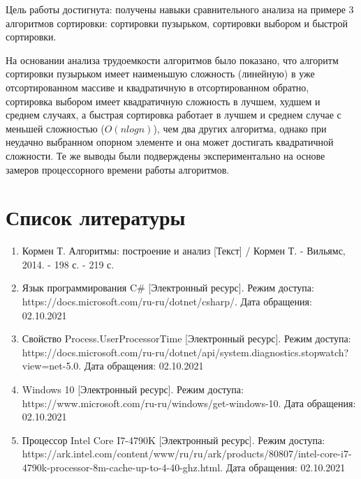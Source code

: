 \documentclass[12pt]{report}
\begin{document}
Цель работы достигнута: получены навыки сравнительного анализа на примере 3 алгоритмов сортировки: сортировки пузырьком, сортировки выбором и быстрой сортировки. 

На основании анализа трудоемкости алгоритмов было показано, что алгоритм сортировки пузырьком имеет наименьшую сложность (линейную) в уже отсортированном массиве и квадратичную в отсортированном обратно, сортировка выбором имеет квадратичную сложность в лучшем, худшем и среднем случаях, а быстрая сортировка работает в лучшем и среднем случае с меньшей сложностью ($O(nlogn)$), чем два других алгоритма, однако при неудачно выбранном опорном элементе и она может достигать квадратичной сложности. Те же выводы были подверждены экспериментально на основе замеров процессорного времени работы алгоритмов. 

\chapter*{Список литературы}
\begin{enumerate}
	\item Кормен Т. Алгоритмы: построение и анализ [Текст] / Кормен Т. - Вильямс, 2014. - 198 с. - 219 с.
	\item Язык программирования C\# [Электронный ресурс]. Режим доступа: https://docs.microsoft.com/ru-ru/dotnet/csharp/. Дата обращения: 02.10.2021
	\item Свойство Process.UserProcessorTime [Электронный ресурс]. Режим доступа: https://docs.microsoft.com/ru-ru/dotnet/api/system.diagnostics.stopwatch?view=net-5.0. Дата обращения: 02.10.2021
	\item Windows 10 [Электронный ресурс]. Режим доступа: https://www.microsoft.com/ru-ru/windows/get-windows-10. Дата обращения: 02.10.2021
	\item Процессор Intel Core I7-4790K [Электронный ресурс]. Режим доступа: https://ark.intel.com/content/www/ru/ru/ark/products/80807/intel-core-i7-4790k-processor-8m-cache-up-to-4-40-ghz.html. Дата обращения: 02.10.2021
	
\end{enumerate}
\end{document}
